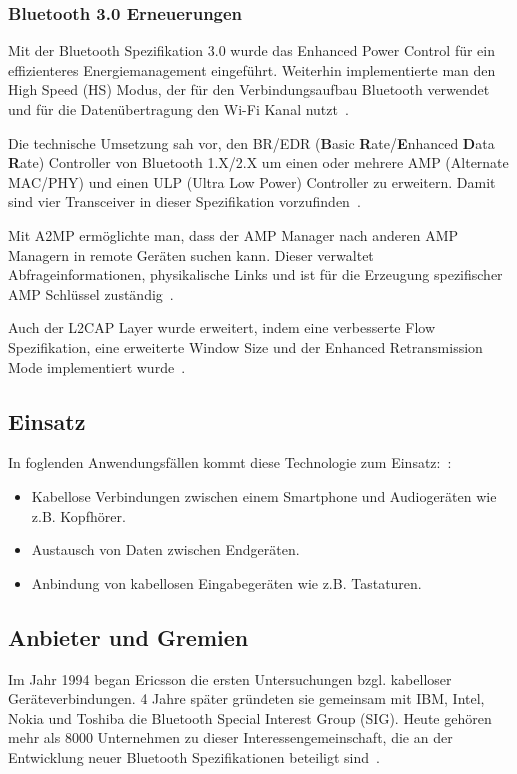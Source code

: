 \begin{multicols}{3}
\subsubsection*{Bluetooth 3.0 Erneuerungen}
Mit der Bluetooth Spezifikation 3.0 wurde das Enhanced Power Control für ein effizienteres Energiemanagement eingeführt. Weiterhin implementierte man den High Speed (HS) Modus, der für den Verbindungsaufbau Bluetooth verwendet und für die Datenübertragung den Wi-Fi Kanal nutzt~\cite{bluetooth3.0.1}.

Die technische Umsetzung sah vor, den BR/EDR (\textbf{B}asic \textbf{R}ate/\textbf{E}nhanced \textbf{D}ata \textbf{R}ate) Controller von Bluetooth 1.X/2.X um einen oder mehrere AMP (Alternate MAC/PHY) und einen ULP (Ultra Low Power) Controller zu erweitern. Damit sind vier Transceiver in dieser Spezifikation vorzufinden~\cite{bluetooth3.0.2}.

Mit A2MP ermöglichte man, dass der AMP Manager nach anderen AMP Managern in remote Geräten suchen kann. Dieser verwaltet Abfrageinformationen, physikalische Links und ist für die Erzeugung spezifischer AMP Schlüssel zuständig~\cite{bluetooth3.0.2}.

Auch der L2CAP Layer wurde erweitert, indem eine verbesserte Flow Spezifikation, eine erweiterte Window Size und der Enhanced Retransmission Mode implementiert wurde~\cite{bluetooth3.0.2}. 

\subsection*{Einsatz}
In foglenden Anwendungsfällen kommt diese Technologie zum Einsatz:~\cite{bluetooth3.0.1}:
\begin{itemize}
	\item Kabellose Verbindungen zwischen einem Smartphone und Audiogeräten wie z.B. Kopfhörer. 
	\item Austausch von Daten zwischen Endgeräten.
	\item Anbindung von kabellosen Eingabegeräten wie z.B. Tastaturen.
\end{itemize}

\subsection*{Anbieter und Gremien}
Im Jahr 1994 began Ericsson die ersten Untersuchungen bzgl. kabelloser Geräteverbindungen. 4 Jahre später gründeten sie gemeinsam mit IBM, Intel, Nokia und Toshiba die Bluetooth Special Interest Group (SIG). Heute gehören mehr als 8000 Unternehmen zu dieser Interessengemeinschaft, die an der Entwicklung neuer Bluetooth Spezifikationen beteiligt sind~\cite{bluetooth3.0.5}.


\end{multicols}

